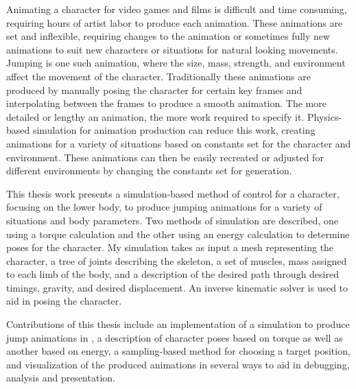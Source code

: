 
Animating a character for video games and films is difficult and time consuming, requiring hours of artist labor to produce each animation.  These animations are set and inflexible, requiring changes to the animation or sometimes fully new animations to suit new characters or situations for natural looking movements.  Jumping is one such animation, where the size, mass, strength, and environment affect the movement of the character.  Traditionally these animations are produced by manually posing the character for certain key frames and interpolating between the frames to produce a smooth animation.  The more detailed or lengthy an animation, the more work required to specify it.  Physics-based simulation for animation production can reduce this work, creating animations for a variety of situations based on constants set for the character and environment.  These animations can then be easily recreated or adjusted for different environments by changing the constants set for generation.

This thesis work presents a simulation-based method of control for a character, focusing on the lower body, to produce jumping animations for a variety of situations and body parameters.  Two methods of simulation are described, one using a torque calculation and the other using an energy calculation to determine poses for the character.  My simulation takes as input a mesh representing the character, a tree of joints describing the skeleton, a set of muscles, mass assigned to each limb of the body, and a description of the desired path through desired timings, gravity, and desired displacement.  An inverse kinematic solver is used to aid in posing the character.

Contributions of this thesis include an implementation of a simulation to produce jump animations in \unity{}, a description of character poses based on torque as well as another based on energy, a sampling-based method for choosing a target position, and visualization of the produced animations in several ways to aid in debugging, analysis and presentation.

